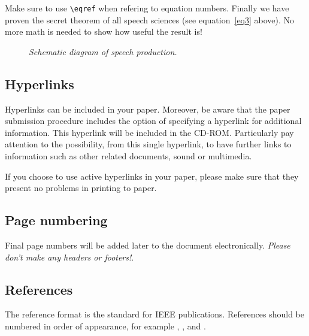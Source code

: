 Make sure to use \verb!\eqref! when refering to equation numbers.
Finally we have proven the secret theorem of all speech sciences (see
equation~\eqref{eq3} above).  No more math is needed to show how 
useful the result is! 

\begin{figure}[t]
\centerline{}
\caption{{\it Schematic diagram of speech production.}}  
\label{spprod}
\end{figure}

\subsection{Hyperlinks}

Hyperlinks can be included in your paper. Moreover, be aware that the paper
submission procedure includes the option of specifying a hyperlink for
additional information.  This hyperlink will be included in the CD-ROM.
Particularly pay attention to the possibility, from this single hyperlink, to
have further links to information such as other related documents, sound or
multimedia.

If you choose to use active hyperlinks in your paper, 
please make sure that they present no problems in printing to paper. 

\subsection{Page numbering}

Final page numbers will be added later to the document
electronically. 
{\em Please don't make any headers or footers!}.

\subsection{References}

The reference format is the standard for IEEE publications.
References should be numbered in order of appearance, 
for example \cite{ES1}, \cite{ES2}, and \cite{ES3}. 
